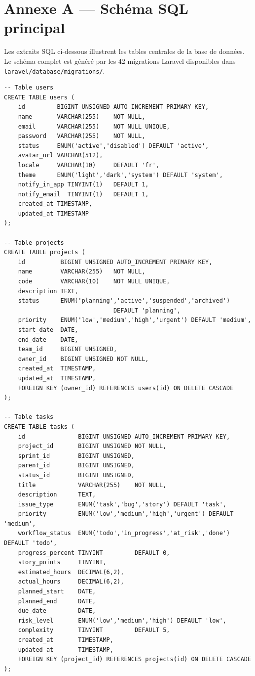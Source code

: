 \chapter{Annexe A — Schéma SQL principal}

Les extraits SQL ci-dessous illustrent les tables centrales de la base de données.
Le schéma complet est généré par les 42 migrations Laravel disponibles dans
\texttt{laravel/database/migrations/}.

\begin{lstlisting}[style=sqlstyle,caption={Schéma SQL — Tables users et projects},label={lst:sql_main}]
-- Table users
CREATE TABLE users (
    id         BIGINT UNSIGNED AUTO_INCREMENT PRIMARY KEY,
    name       VARCHAR(255)    NOT NULL,
    email      VARCHAR(255)    NOT NULL UNIQUE,
    password   VARCHAR(255)    NOT NULL,
    status     ENUM('active','disabled') DEFAULT 'active',
    avatar_url VARCHAR(512),
    locale     VARCHAR(10)     DEFAULT 'fr',
    theme      ENUM('light','dark','system') DEFAULT 'system',
    notify_in_app TINYINT(1)   DEFAULT 1,
    notify_email  TINYINT(1)   DEFAULT 1,
    created_at TIMESTAMP,
    updated_at TIMESTAMP
);

-- Table projects
CREATE TABLE projects (
    id          BIGINT UNSIGNED AUTO_INCREMENT PRIMARY KEY,
    name        VARCHAR(255)   NOT NULL,
    code        VARCHAR(10)    NOT NULL UNIQUE,
    description TEXT,
    status      ENUM('planning','active','suspended','archived')
                               DEFAULT 'planning',
    priority    ENUM('low','medium','high','urgent') DEFAULT 'medium',
    start_date  DATE,
    end_date    DATE,
    team_id     BIGINT UNSIGNED,
    owner_id    BIGINT UNSIGNED NOT NULL,
    created_at  TIMESTAMP,
    updated_at  TIMESTAMP,
    FOREIGN KEY (owner_id) REFERENCES users(id) ON DELETE CASCADE
);

-- Table tasks
CREATE TABLE tasks (
    id               BIGINT UNSIGNED AUTO_INCREMENT PRIMARY KEY,
    project_id       BIGINT UNSIGNED NOT NULL,
    sprint_id        BIGINT UNSIGNED,
    parent_id        BIGINT UNSIGNED,
    status_id        BIGINT UNSIGNED,
    title            VARCHAR(255)    NOT NULL,
    description      TEXT,
    issue_type       ENUM('task','bug','story') DEFAULT 'task',
    priority         ENUM('low','medium','high','urgent') DEFAULT 'medium',
    workflow_status  ENUM('todo','in_progress','at_risk','done') DEFAULT 'todo',
    progress_percent TINYINT         DEFAULT 0,
    story_points     TINYINT,
    estimated_hours  DECIMAL(6,2),
    actual_hours     DECIMAL(6,2),
    planned_start    DATE,
    planned_end      DATE,
    due_date         DATE,
    risk_level       ENUM('low','medium','high') DEFAULT 'low',
    complexity       TINYINT         DEFAULT 5,
    created_at       TIMESTAMP,
    updated_at       TIMESTAMP,
    FOREIGN KEY (project_id) REFERENCES projects(id) ON DELETE CASCADE
);


\end{lstlisting}
